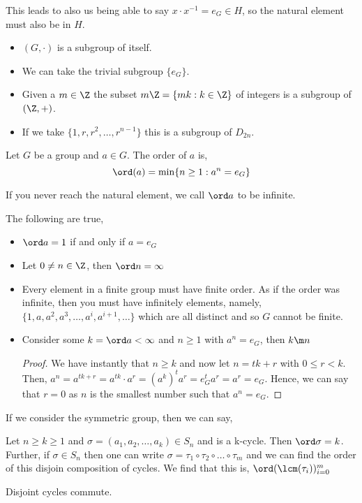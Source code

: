 This leads to also us being able to say $x \cdot x ^{-1} = e_G \in H$, so the natural element must also be in $H$.

\begin{eg}
  \begin{itemize}
    \item $(G, \cdot)$ is a subgroup of itself.
    \item We can take the trivial subgroup $\{e_G\}$.
    \item Given a $m \in \Z$ the subset $m\Z = \{mk : k \in \Z\}$ of integers is a subgroup of $(\Z, +)$.
    \item If we take $\{1, r, r^2, \dots, r^{n-1}\}$ this is a subgroup of $D_{2n}$.
  \end{itemize}
\end{eg}

\begin{ndefi}
  Let $G$ be a group and $a \in G$. The order of $a$ is,
  $$ \ord (a) = \min \{n \ge 1 : a^n = e_G\} $$
\end{ndefi}
If you never reach the natural element, we call $\ord a$ to be infinite.

\begin{nlemma}
  The following are true,
  \begin{itemize}
    \item $\ord a = 1$ if and only if $a = e_G$
    \item Let $0 \ne n \in \Z$, then $\ord n = \infty$
    \item Every element in a finite group must have finite order. As if the order was infinite, then you must have infinitely elements, namely, $\{1, a, a^2, a^3, \dots, a^i, a^{i+1}, \dots\}$ which are all distinct and so $G$ cannot be finite.
    \item Consider some $k = \ord a < \infty$ and $n \ge 1$ with $a^n = e_G$, then $k \m n$
    \begin{proof}
      We have instantly that $n \ge k$ and now let $n = tk + r$ with $0 \le r < k$. Then, $a^n = a^{tk+r} = a^{tk} \cdot a^r = (a^k)^ta^r = e_G^ta^r = a^r = e_G$. Hence, we can say that $r = 0$ as $n$ is the smallest number such that $a^n = e_G$.
    \end{proof}
  \end{itemize}
\end{nlemma}

If we consider the symmetric group, then we can say,
\begin{nlemma}
  Let $n \ge k \ge 1$ and $\sigma = (a_1, a_2, \dots, a_k) \in S_n$ and is a k-cycle. Then $\ord \sigma = k$. Further, if $\sigma \in S_n$ then one can write $\sigma = \tau_1 \circ \tau_2 \circ \dots \circ \tau_m$ and we can find the order of this disjoin composition of cycles. We find that this is, $\ord (\lcm(\tau_i))_{i=0}^m$
\end{nlemma}

\begin{remark}
   Disjoint cycles commute. 
\end{remark}
